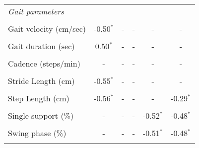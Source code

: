 \begin{landscape}
\begin{table}[ht]
\begin{tabular}{lccccc}
\emph{Gait parameters}  &  & & & &   \\ \\
\hspace{0.3cm} Gait velocity (cm/sec)  & -0.50\textbf{$^\ast$} & - & - & - & - \\ \\
\hspace{0.3cm} Gait duration (sec)  & 0.50\textbf{$^\ast$} & - & - & - & - \\ \\
\hspace{0.3cm} Cadence (steps/min)  &  - & - & - & - & - \\ \\
\hspace{0.3cm} Stride Length (cm)  & -0.55\textbf{$^\ast$} & - & - & - & - \\ \\
\hspace{0.3cm} Step Length (cm)  & -0.56\textbf{$^\ast$} & - & - & - & -0.29\textbf{$^\ast$} \\ \\
\hspace{0.3cm} Single support (\%)  & - & - & - & -0.52\textbf{$^\ast$} & -0.48\textbf{$^\ast$}\\ \\
\hspace{0.3cm} Swing phase (\%)  & - & - & - & -0.51\textbf{$^\ast$} & -0.48\textbf{$^\ast$} \\ \\
\hline
\end{tabular}
\label{tab:pearson}
\end{table}
\end{landscape}
